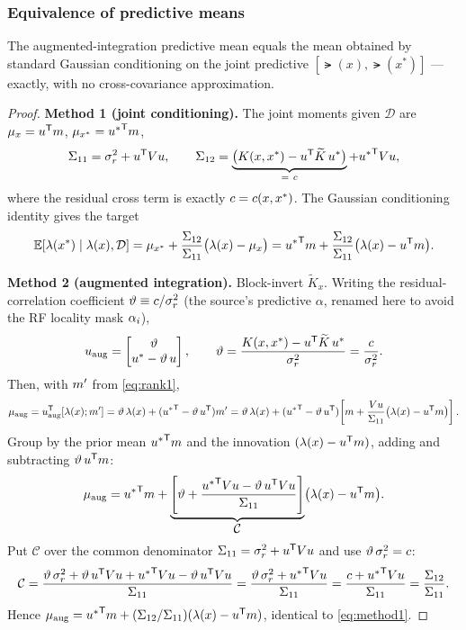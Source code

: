 \subsubsection{Equivalence of predictive means}
\begin{theorem}\label{thm:predmean-equiv}
The augmented-integration predictive mean equals the mean obtained by standard
Gaussian conditioning on the joint predictive $[\lat(x),\lat(x^*)]$ --- exactly,
with no cross-covariance approximation.
\end{theorem}
\begin{proof}
\textbf{Method 1 (joint conditioning).} The joint moments given $\mathcal{D}$ are
$\mu_x=u^{\mathsf{T}}m$, $\mu_{x^*}={u^*}^{\mathsf{T}}m$,
\[
  \Sigma_{11}=\varr+\pv\transpose\vV\pv,\qquad
  \Sigma_{12}=\underbrace{\bigl(\Kf(x,x^*)-\pv\transpose\Ktil\,\pv^*\bigr)}_{=\ \ccond}+{\pv^*}\transpose\vV\pv,
\]
where the residual cross term is exactly $c=c(x,x^*)$. The Gaussian
conditioning identity gives the target
\begin{equation}\label{eq:method1}
  \mathbb{E}[\lambda(x^*)\mid\lambda(x),\mathcal{D}]
  =\mu_{x^*}+\frac{\Sigma_{12}}{\Sigma_{11}}\bigl(\lambda(x)-\mu_x\bigr)
  ={u^*}^{\mathsf{T}}m+\frac{\Sigma_{12}}{\Sigma_{11}}\bigl(\lambda(x)-u^{\mathsf{T}}m\bigr).
\end{equation}

\textbf{Method 2 (augmented integration).} Block-invert $\widetilde{K}_x$. Writing
the residual-correlation coefficient $\vartheta\equiv c/\sigma_{r}^{2}$ (the source's
predictive $\alpha$, renamed here to avoid the RF locality mask $\alpha_i$),
\[
  u_{\mathrm{aug}}=\begin{bmatrix}\vartheta\\ u^*-\vartheta\,u\end{bmatrix},
  \qquad \vartheta=\frac{K(x,x^*)-u^{\mathsf{T}}\widetilde{K}\,u^*}{\sigma_{r}^{2}}=\frac{c}{\sigma_{r}^{2}}.
\]
Then, with $m'$ from \eqref{eq:rank1},
\[
  \mu_{\mathrm{aug}}=u_{\mathrm{aug}}^{\mathsf{T}}[\lambda(x);m']
  =\vartheta\,\lambda(x)+({u^*}^{\mathsf{T}}-\vartheta\,u^{\mathsf{T}})m'
  =\vartheta\,\lambda(x)+({u^*}^{\mathsf{T}}-\vartheta\,u^{\mathsf{T}})\!\left[m+\frac{Vu}{\Sigma_{11}}\bigl(\lambda(x)-u^{\mathsf{T}}m\bigr)\right].
\]
Group by the prior mean ${u^*}^{\mathsf{T}}m$ and the innovation
$(\lambda(x)-u^{\mathsf{T}}m)$, adding and subtracting $\vartheta\,u^{\mathsf{T}}m$:
\[
  \mu_{\mathrm{aug}}={u^*}^{\mathsf{T}}m
   +\underbrace{\left[\vartheta+\frac{{u^*}^{\mathsf{T}}Vu-\vartheta\,u^{\mathsf{T}}Vu}{\Sigma_{11}}\right]}_{\displaystyle \mathcal{C}}
   \bigl(\lambda(x)-u^{\mathsf{T}}m\bigr).
\]
Put $\mathcal{C}$ over the common denominator $\Sigma_{11}=\sigma_{r}^{2}+u^{\mathsf{T}}Vu$
and use $\vartheta\,\sigma_{r}^{2}=c$:
\[
  \mathcal{C}=\frac{\vartheta\,\sigma_{r}^{2}+\vartheta\,u^{\mathsf{T}}Vu+{u^*}^{\mathsf{T}}Vu-\vartheta\,u^{\mathsf{T}}Vu}{\Sigma_{11}}
   =\frac{\vartheta\,\sigma_{r}^{2}+{u^*}^{\mathsf{T}}Vu}{\Sigma_{11}}
   =\frac{c+{u^*}^{\mathsf{T}}Vu}{\Sigma_{11}}
   =\frac{\Sigma_{12}}{\Sigma_{11}}.
\]
Hence $\mu_{\mathrm{aug}}={u^*}^{\mathsf{T}}m+(\Sigma_{12}/\Sigma_{11})(\lambda(x)-u^{\mathsf{T}}m)$,
identical to \eqref{eq:method1}.
\end{proof}


